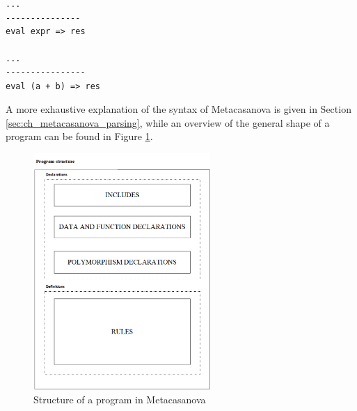 \begin{lstlisting}
...
---------------
eval expr => res

...
----------------
eval (a + b) => res
\end{lstlisting} 

\noindent
A more exhaustive explanation of the syntax of Metacasanova is given in Section \ref{sec:ch_metacasanova_parsing}, while an overview of the general shape of a program can be found in Figure \ref{fig:ch_metacasanova_program_structure}.

\begin{figure}[H]
	\centering
	\includegraphics[width = 0.6\textwidth]{Figures/chapter_metacasanova/program_structure}
	\caption{Structure of a program in Metacasanova}
	\label{fig:ch_metacasanova_program_structure}
\end{figure}

